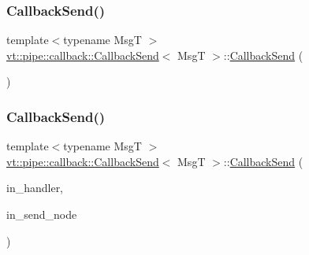\mbox{\label{structvt_1_1pipe_1_1callback_1_1_callback_send_accc854042b241e9e5149f4c48da57ed1}} 
\subsubsection{\texorpdfstring{Callback\+Send()}{CallbackSend()}\hspace{0.1cm}{\footnotesize\ttfamily [3/4]}}
{\footnotesize\ttfamily template$<$typename MsgT $>$ \\
\hyperlink{structvt_1_1pipe_1_1callback_1_1_callback_send}{vt\+::pipe\+::callback\+::\+Callback\+Send}$<$ MsgT $>$\+::\hyperlink{structvt_1_1pipe_1_1callback_1_1_callback_send}{Callback\+Send} (\begin{DoxyParamCaption}\item[{\hyperlink{structvt_1_1pipe_1_1callback_1_1_callback_send}{Callback\+Send}$<$ MsgT $>$ \&\&}]{ }\end{DoxyParamCaption})\hspace{0.3cm}{\ttfamily [default]}}

\mbox{\label{structvt_1_1pipe_1_1callback_1_1_callback_send_a058cceb367d32fe1235f1f05bf6d387d}} 
\subsubsection{\texorpdfstring{Callback\+Send()}{CallbackSend()}\hspace{0.1cm}{\footnotesize\ttfamily [4/4]}}
{\footnotesize\ttfamily template$<$typename MsgT $>$ \\
\hyperlink{structvt_1_1pipe_1_1callback_1_1_callback_send}{vt\+::pipe\+::callback\+::\+Callback\+Send}$<$ MsgT $>$\+::\hyperlink{structvt_1_1pipe_1_1callback_1_1_callback_send}{Callback\+Send} (\begin{DoxyParamCaption}\item[{\hyperlink{namespacevt_af64846b57dfcaf104da3ef6967917573}{Handler\+Type} const \&}]{in\+\_\+handler,  }\item[{\hyperlink{namespacevt_a866da9d0efc19c0a1ce79e9e492f47e2}{Node\+Type} const \&}]{in\+\_\+send\+\_\+node }\end{DoxyParamCaption})}



